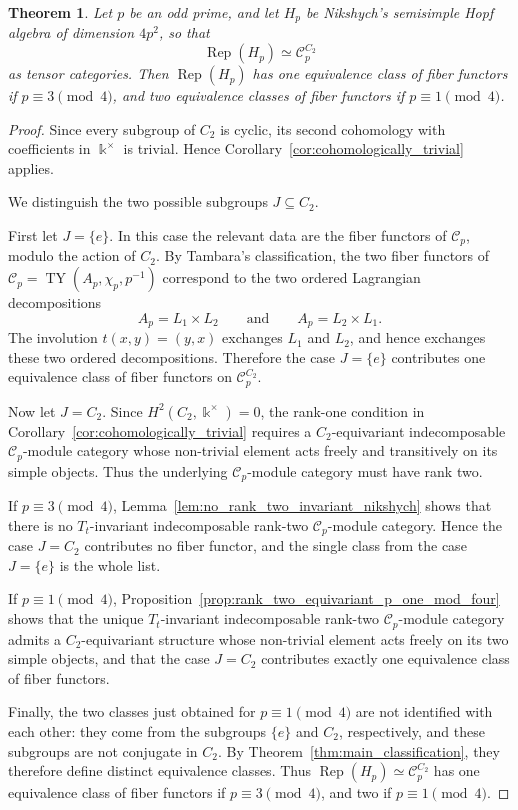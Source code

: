 \documentclass[12pt]{amsart}
\theoremstyle{plain}
\newtheorem{theorem}{Theorem}[section]
\theoremstyle{definition} %
\theoremstyle{remark} %
\newcommand{\ku}{{\Bbbk}} %
\newcommand{\cC}{\mathcal{C}}
\newcommand{\TY}{\operatorname{TY}}
\newcommand{\Rep}{\operatorname{Rep}}
\begin{document}
\begin{theorem}\label{thm:nikshych_fiber_functors}
Let $p$ be an odd prime, and let $H_p$ be Nikshych's semisimple Hopf algebra
of dimension $4p^2$, so that
\[
\Rep(H_p)\simeq \cC_p^{C_2}
\]
as tensor categories. Then $\Rep(H_p)$ has one equivalence class of fiber
functors if $p\equiv3\pmod4$, and two equivalence classes of fiber functors
if $p\equiv1\pmod4$.
\end{theorem}
\begin{proof}
Since every subgroup of $C_2$ is cyclic, its second cohomology with
coefficients in $\ku^\times$ is trivial. Hence
Corollary~\ref{cor:cohomologically_trivial} applies.

We distinguish the two possible subgroups $J\subseteq C_2$.

First let $J=\{e\}$. In this case the relevant data are the fiber functors of
$\cC_p$, modulo the action of $C_2$. By Tambara's classification, the two
fiber functors of $\cC_p=\TY(A_p,\chi_p,p^{-1})$ correspond to the two ordered
Lagrangian decompositions
\[
A_p=L_1\times L_2
\qquad\text{and}\qquad
A_p=L_2\times L_1.
\]
The involution $t(x,y)=(y,x)$ exchanges $L_1$ and $L_2$, and hence exchanges
these two ordered decompositions. Therefore the case $J=\{e\}$ contributes
one equivalence class of fiber functors on $\cC_p^{C_2}$.

Now let $J=C_2$. Since $H^2(C_2,\ku^\times)=0$, the rank-one condition in
Corollary~\ref{cor:cohomologically_trivial} requires a $C_2$-equivariant
indecomposable $\cC_p$-module category whose non-trivial element acts freely
and transitively on its simple objects. Thus the underlying $\cC_p$-module
category must have rank two.

If $p\equiv3\pmod4$, Lemma~\ref{lem:no_rank_two_invariant_nikshych} shows
that there is no $T_t$-invariant indecomposable rank-two $\cC_p$-module
category. Hence the case $J=C_2$ contributes no fiber functor, and the single
class from the case $J=\{e\}$ is the whole list.

If $p\equiv1\pmod4$, Proposition~\ref{prop:rank_two_equivariant_p_one_mod_four}
shows that the unique $T_t$-invariant indecomposable rank-two
$\cC_p$-module category admits a $C_2$-equivariant structure whose
non-trivial element acts freely on its two simple objects, and that the case
$J=C_2$ contributes exactly one equivalence class of fiber functors.

Finally, the two classes just obtained for $p\equiv1\pmod4$ are not identified
with each other: they come from the subgroups $\{e\}$ and $C_2$, respectively,
and these subgroups are not conjugate in $C_2$. By
Theorem~\ref{thm:main_classification}, they therefore define distinct
equivalence classes. Thus $\Rep(H_p)\simeq\cC_p^{C_2}$ has one equivalence
class of fiber functors if $p\equiv3\pmod4$, and two if
$p\equiv1\pmod4$.
\end{proof}
\end{document}
